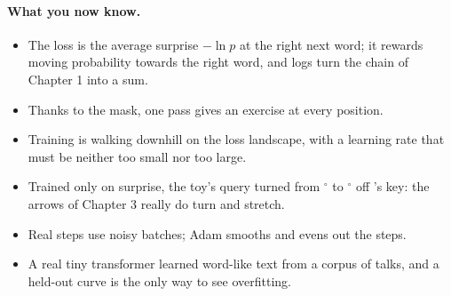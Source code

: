 \paragraph{What you now know.}
\begin{itemize}
\item The loss is the average surprise $-\ln p$ at the right next word; it rewards moving probability towards
the right word, and logs turn the chain of Chapter 1 into a sum.
\item Thanks to the mask, one pass gives an exercise at every position.
\item Training is walking downhill on the loss landscape, with a learning rate that must be neither too small
nor too large.
\item Trained only on surprise, the toy's query turned from \nEightTrainAngStart$^\circ$ to
\nEightTrainGoodAngEnd$^\circ$ off 's key: the arrows of Chapter 3 really do turn and stretch.
\item Real steps use noisy batches; Adam smooths and evens out the steps.
\item A real tiny transformer learned word-like text from a corpus of talks, and a held-out curve is the only
way to see overfitting.
\end{itemize}
